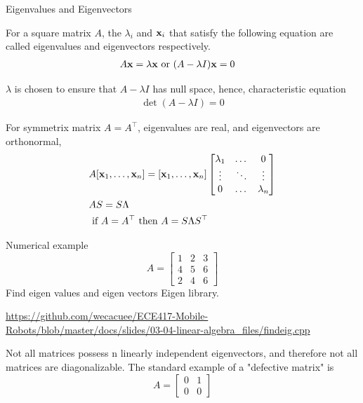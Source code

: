 \documentclass[times,t]{beamer}
\begin{document}
\begin{frame}{Eigenvalues  and Eigenvectors}

For a  square  matrix $A$, the $\lambda_i$ and  $\mathbf{x}_i$ that satisfy  the
following equation are called eigenvalues and  eigenvectors  respectively.
\begin{align}
  A  \mathbf{x} &= \lambda \mathbf{x} \text{ or } (A  - \lambda I)\mathbf{x}  = 0
\end{align}

$\lambda$ is   chosen to ensure  that   $A  -  \lambda I$  has null space,
hence, characteristic   equation
\begin{align}
  \det(A  - \lambda I) = 0 
 \end{align}

 For  symmetrix matrix $A =  A^\top$, eigenvalues  are  real, and eigenvectors
 are orthonormal,
 \begin{align}
   &A[\mathbf{x}_1, \dots,   \mathbf{x}_n]  = [\mathbf{x}_1, \dots,   \mathbf{x}_n]\begin{bmatrix}\lambda_1 &   \dots   &  0 \\
     \vdots   &   \ddots &  \vdots \\
   0 &   \dots  &  \lambda_n \end{bmatrix}
                  \\
   &A  S = S  \Lambda
   \\
   &\text{  if   }  A =  A^\top \text{ then   }  A   = S \Lambda S^\top
   \end{align}


\end{frame}


\begin{frame}{Numerical example}
  \[
  A   =  \begin{bmatrix}
    1 &   2  &  3  \\
    4 & 5 &   6 \\
    2 & 4 &   6
  \end{bmatrix}
  \]
Find eigen values and eigen vectors Eigen library.

\url{https://github.com/wecacuee/ECE417-Mobile-Robots/blob/master/docs/slides/03-04-linear-algebra_files/findeig.cpp}

\end{frame}

\begin{frame}
  Not all matrices possess n linearly independent eigenvectors, and
  therefore not all matrices are diagonalizable. The standard example of a
  "defective matrix" is
  \[
    A = \begin{bmatrix}
      0 & 1 \\ 0 & 0
      \end{bmatrix}
      \]
\end{frame}
\end{document}
